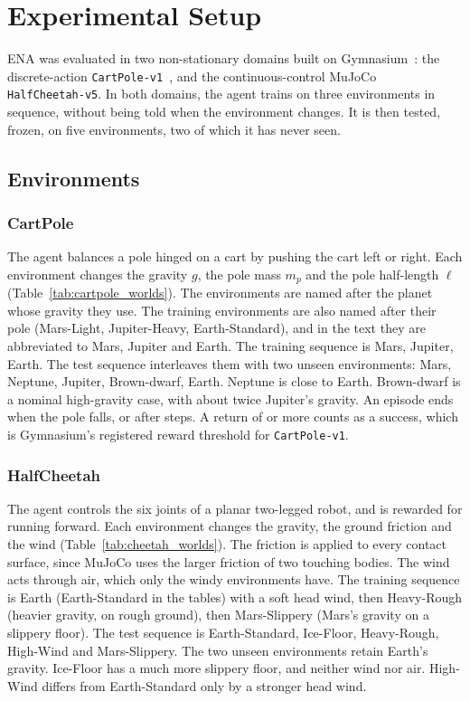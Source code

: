 \section{Experimental Setup}
\label{sec:setup}

ENA was evaluated in two non-stationary domains built on Gymnasium~\cite{towers2024gymnasium}: the discrete-action \texttt{CartPole-v1}~\cite{barto1983neuronlike}, and the continuous-control MuJoCo~\cite{todorov2012mujoco} \texttt{HalfCheetah-v5}. In both domains, the agent trains on three environments in sequence, without being told when the environment changes. It is then tested, frozen, on five environments, two of which it has never seen.

\subsection{Environments}

\subsubsection{CartPole}
The agent balances a pole hinged on a cart by pushing the cart left or right. Each environment changes the gravity $g$, the pole mass $m_p$ and the pole half-length $\ell$ (Table~\ref{tab:cartpole_worlds}). The environments are named after the planet whose gravity they use. The training environments are also named after their pole (Mars-Light, Jupiter-Heavy, Earth-Standard), and in the text they are abbreviated to Mars, Jupiter and Earth. The training sequence is Mars, Jupiter, Earth. The test sequence interleaves them with two unseen environments: Mars, Neptune, Jupiter, Brown-dwarf, Earth. Neptune is close to Earth. Brown-dwarf is a nominal high-gravity case, with about twice Jupiter's gravity. An episode ends when the pole falls, or after  steps. A return of  or more counts as a success, which is Gymnasium's registered reward threshold for \texttt{CartPole-v1}.



\subsubsection{HalfCheetah}
The agent controls the six joints of a planar two-legged robot, and is rewarded for running forward. Each environment changes the gravity, the ground friction and the wind (Table~\ref{tab:cheetah_worlds}). The friction is applied to every contact surface, since MuJoCo uses the larger friction of two touching bodies. The wind acts through air, which only the windy environments have. The training sequence is Earth (Earth-Standard in the tables) with a soft head wind, then Heavy-Rough (heavier gravity, on rough ground), then Mars-Slippery (Mars's gravity on a slippery floor). The test sequence is Earth-Standard, Ice-Floor, Heavy-Rough, High-Wind and Mars-Slippery. The two unseen environments retain Earth's gravity. Ice-Floor has a much more slippery floor, and neither wind nor air. High-Wind differs from Earth-Standard only by a stronger head wind.

